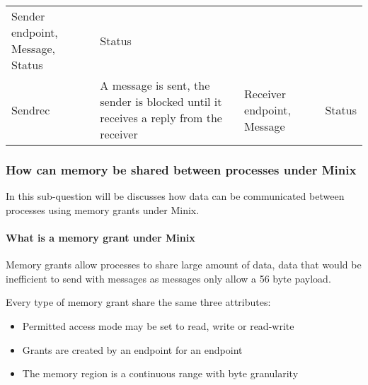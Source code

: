 \begin{longtable}[]{@{}llll@{}}
\begin{minipage}[t]{0.30\columnwidth}
Sender endpoint, Message, Status\strut
\end{minipage} & \begin{minipage}[t]{0.25\columnwidth}\raggedright
Status\strut
\end{minipage}\tabularnewline
\begin{minipage}[t]{0.11\columnwidth}\raggedright
Sendrec\strut
\end{minipage} & \begin{minipage}[t]{0.23\columnwidth}\raggedright
A message is sent, the sender is blocked until it receives a reply from
the receiver\strut
\end{minipage} & \begin{minipage}[t]{0.30\columnwidth}\raggedright
Receiver endpoint, Message\strut
\end{minipage} & \begin{minipage}[t]{0.25\columnwidth}\raggedright
Status\strut
\end{minipage}\tabularnewline
\bottomrule
\end{longtable}

\hypertarget{how-can-memory-be-shared-between-processes-under-minix}{%
\subsubsection{How can memory be shared between processes under
Minix}\label{how-can-memory-be-shared-between-processes-under-minix}}

In this sub-question will be discusses how data can be communicated
between processes using memory grants under Minix.

\hypertarget{what-is-a-memory-grant-under-minix}{%
\paragraph{What is a memory grant under
Minix}\label{what-is-a-memory-grant-under-minix}}

Memory grants allow processes to share large amount of data, data that
would be inefficient to send with messages as messages only allow a 56
byte payload.

Every type of memory grant share the same three attributes:

\begin{itemize}
\tightlist
\item
  Permitted access mode may be set to read, write or read-write
\item
  Grants are created by an endpoint for an endpoint
\item
  The memory region is a continuous range with byte granularity
\end{itemize}

